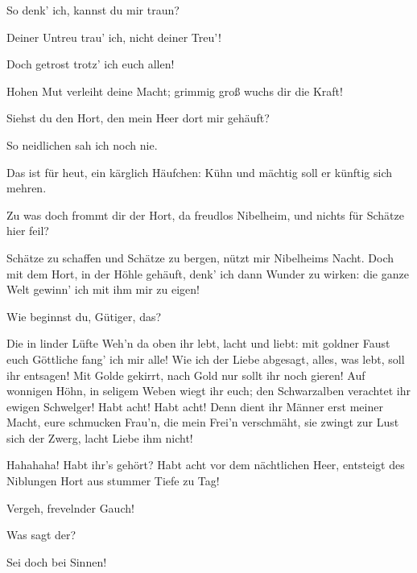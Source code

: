 \begin{drama}
\Logespeaks
So denk' ich, kannst du mir traun?
 

\Alberichspeaks
Deiner Untreu trau' ich, nicht deiner Treu'!
 



Doch getrost trotz' ich euch allen!
 

\Logespeaks
Hohen Mut verleiht deine Macht;
grimmig groß wuchs dir die Kraft!
 

\Alberichspeaks
Siehst du den Hort,
den mein Heer dort mir gehäuft?
 

\Logespeaks
So neidlichen sah ich noch nie.
 

\Alberichspeaks
Das ist für heut, ein kärglich Häufchen:
Kühn und mächtig soll er künftig sich mehren.
 

\Wotanspeaks
Zu was doch frommt dir der Hort,
da freudlos Nibelheim,
und nichts für Schätze hier feil?
 

\Alberichspeaks
Schätze zu schaffen und Schätze zu bergen,
nützt mir Nibelheims Nacht.
Doch mit dem Hort, in der Höhle gehäuft,
denk' ich dann Wunder zu wirken:
die ganze Welt gewinn' ich mit ihm mir zu eigen!
 

\Wotanspeaks
Wie beginnst du, Gütiger, das?
 

\Alberichspeaks
Die in linder Lüfte Weh'n da oben ihr lebt,
lacht und liebt: mit goldner Faust
euch Göttliche fang' ich mir alle!
Wie ich der Liebe abgesagt,
alles, was lebt, soll ihr entsagen!
Mit Golde gekirrt,
nach Gold nur sollt ihr noch gieren!
Auf wonnigen Höhn,
in seligem Weben wiegt ihr euch;
den Schwarzalben
verachtet ihr ewigen Schwelger!
Habt acht! Habt acht!
Denn dient ihr Männer erst meiner Macht,
eure schmucken Frau'n, die mein Frei'n verschmäht,
sie zwingt zur Lust sich der Zwerg,
lacht Liebe ihm nicht!
 



Hahahaha! Habt ihr's gehört?
Habt acht vor dem nächtlichen Heer,
entsteigt des Niblungen Hort
aus stummer Tiefe zu Tag!
 

\Wotanspeaks


Vergeh, frevelnder Gauch!
 

\Alberichspeaks
Was sagt der?
 

\Logespeaks


Sei doch bei Sinnen!
 



\end{drama}
